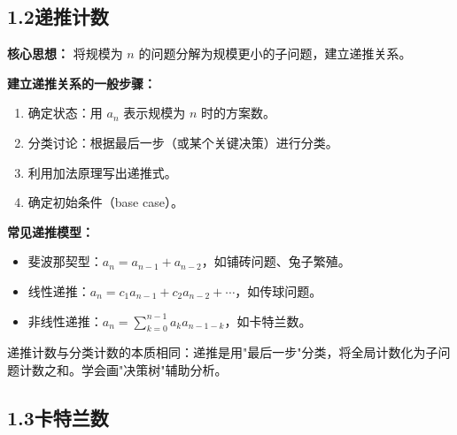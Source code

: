 \documentclass[12pt, a4paper]{ctexart}
\begin{document}
\subsection*{1.2\quad 递推计数}

\begin{knowledgebox}[递推计数方法]
\textbf{核心思想：} 将规模为 \(n\) 的问题分解为规模更小的子问题，建立递推关系。

\textbf{建立递推关系的一般步骤：}
\begin{enumerate}[leftmargin=1.5em]
  \item 确定状态：用 \(a_n\) 表示规模为 \(n\) 时的方案数。
  \item 分类讨论：根据最后一步（或某个关键决策）进行分类。
  \item 利用加法原理写出递推式。
  \item 确定初始条件（base case）。
\end{enumerate}

\textbf{常见递推模型：}
\begin{itemize}[leftmargin=1.5em]
  \item 斐波那契型：\(a_n = a_{n-1} + a_{n-2}\)，如铺砖问题、兔子繁殖。
  \item 线性递推：\(a_n = c_1 a_{n-1} + c_2 a_{n-2} + \cdots\)，如传球问题。
  \item 非线性递推：\(a_n = \sum_{k=0}^{n-1} a_k a_{n-1-k}\)，如卡特兰数。
\end{itemize}
\end{knowledgebox}

\begin{tipbox}[规律]
递推计数与分类计数的本质相同：递推是用"最后一步"分类，将全局计数化为子问题计数之和。学会画"决策树"辅助分析。
\end{tipbox}

\subsection*{1.3\quad 卡特兰数}
\end{document}
